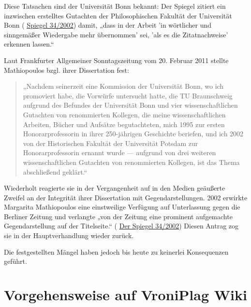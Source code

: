 \documentclass[ngerman,final,fontsize=12pt,paper=a4,twoside,bibliography=totoc,BCOR=8mm,draft=false]{scrartcl}
\begin{document}

Diese Tatsachen sind der Universität Bonn bekannt: Der Spiegel zitiert ein inzwischen erstelltes Gutachten der Philosophischen Fakultät der Universität Bonn (%
\href{http://www.spiegel.de/spiegel/print/d-23905874.html}{Spiegel 34/2002}) damit, „dass in der Arbeit 'in wörtlicher und sinngemäßer Wiedergabe mehr übernommen' sei, 'als es die Zitatnachweise' erkennen lassen.“ 


Laut Frankfurter Allgemeiner Sonntagszeitung vom 20. Februar 2011 stellte Mathiopoulos bzgl. ihrer Dissertation fest: 

\begin{quote}
„Nachdem seinerzeit eine Kommission der Universität Bonn, wo ich promoviert habe, die Vorwürfe untersucht hatte, die TU Braunschweig aufgrund des Befundes der Universität Bonn und vier wissenschaftlichen Gutachten von renommierten Kollegen, die meine wissenschaftlichen Arbeiten, Bücher und Aufsätze begutachteten, mich 1995 zur ersten Honorarprofessorin in ihrer 250-jährigen Geschichte beriefen, und ich 2002 von der Historischen Fakultät der Universität Potsdam zur Honorarprofessorin ernannt wurde --- aufgrund von drei weiteren wissenschaftlichen Gutachten von renommierten Kollegen, ist das Thema abschließend geklärt.“\end{quote}

Wiederholt reagierte sie in der Vergangenheit auf in den Medien geäußerte Zweifel an der Integrität ihrer Dissertation mit Gegendarstellungen. 2002 erwirkte Margarita Mathiopoulos eine einstweilige Verfügung auf Unterlassung gegen die Berliner Zeitung und verlangte „von der Zeitung eine prominent aufgemachte Gegendarstellung auf der Titelseite.“ (%
\href{http://www.spiegel.de/spiegel/print/d-23905874.html}{Der Spiegel 34/2002}) Diesen Antrag zog sie in der Hauptverhandlung wieder zurück. 


Die festgestellten Mängel haben jedoch bis heute zu keinerlei Konsequenzen geführt. 

\section{%
Vorgehensweise auf VroniPlag Wiki}
\end{document}
